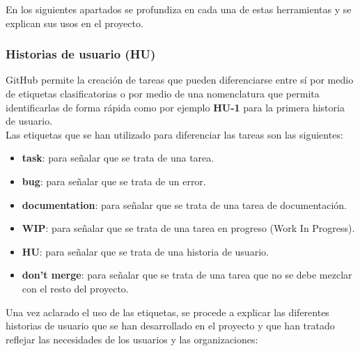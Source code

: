 En los siguientes apartados se profundiza en cada una de estas herramientas y se explican sus usos en el proyecto.

\subsubsection{Historias de usuario (HU)}
GitHub permite la creación de tareas que pueden diferenciarse entre sí por medio de etiquetas clasificatorias o
por medio de una nomenclatura que permita identificarlas de forma rápida como por ejemplo \textbf{HU-1} para
la primera historia de usuario. \\

Las etiquetas que se han utilizado para diferenciar las tareas son las siguientes:

\begin{itemize}
    \item \textbf{task}: para señalar que se trata de una tarea.
    \item \textbf{bug}: para señalar que se trata de un error.
    \item \textbf{documentation}: para señalar que se trata de una tarea de documentación.
    \item \textbf{WIP}: para señalar que se trata de una tarea en progreso (Work In Progress).
    \item \textbf{HU}: para señalar que se trata de una historia de usuario.
    \item \textbf{don't merge}: para señalar que se trata de una tarea que no se debe mezclar con el resto del proyecto.
\end{itemize}

Una vez aclarado el uso de las etiquetas, se procede a explicar las diferentes historias de usuario que se han
desarrollado en el proyecto y que han tratado reflejar las necesidades de los usuarios y las organizaciones:

